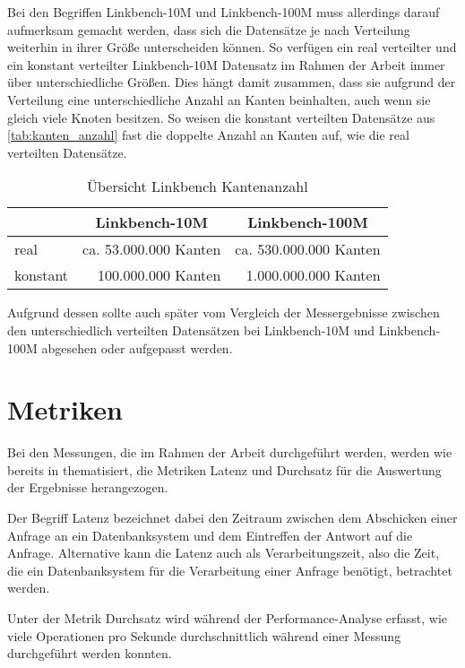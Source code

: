 Bei den Begriffen Linkbench-10M und Linkbench-100M muss allerdings darauf aufmerksam gemacht werden, dass sich die Datensätze je nach Verteilung weiterhin in ihrer Größe unterscheiden können. So verfügen ein real verteilter und ein konstant verteilter Linkbench-10M Datensatz im Rahmen der Arbeit immer über unterschiedliche Größen. Dies hängt damit zusammen, dass sie aufgrund der Verteilung eine unterschiedliche Anzahl an Kanten beinhalten, auch wenn sie gleich viele Knoten besitzen. So weisen die konstant verteilten Datensätze aus \autoref{tab:kanten_anzahl} fast die doppelte Anzahl an Kanten auf, wie die real verteilten Datensätze. 

\begin{table}[ht]
    \centering
    \begin{tabular}{l|r|r}
    \hline
    \rowcolor[HTML]{EFEFEF} 
    \multicolumn{1}{c|}{\cellcolor[HTML]{EFEFEF}\textbf{Verteilung}} & \multicolumn{1}{c|}{\cellcolor[HTML]{EFEFEF}\textbf{Linkbench-10M}} & \multicolumn{1}{c}{\cellcolor[HTML]{EFEFEF}\textbf{Linkbench-100M}} \\ \hline
    real & ca. 53.000.000 Kanten & ca. 530.000.000 Kanten \\
    konstant & 100.000.000 Kanten & 1.000.000.000 Kanten \\ \hline
    \end{tabular}
    \caption{Übersicht Linkbench Kantenanzahl}
    \label{tab:kanten_anzahl}
\end{table}

Aufgrund dessen sollte auch später vom Vergleich der Messergebnisse zwischen den unterschiedlich verteilten Datensätzen bei Linkbench-10M und Linkbench-100M abgesehen oder aufgepasst werden.

\section{Metriken}
\label{analyse:metriken}
Bei den Messungen, die im Rahmen der Arbeit durchgeführt werden, werden wie bereits in \cite{sigmod_tian} thematisiert, die Metriken Latenz und Durchsatz für die Auswertung der Ergebnisse herangezogen. 

Der Begriff Latenz bezeichnet dabei den Zeitraum zwischen dem Abschicken einer Anfrage an ein Datenbanksystem und dem Eintreffen der Antwort auf die Anfrage. Alternative kann die Latenz auch als Verarbeitungszeit, also die Zeit, die ein Datenbanksystem für die Verarbeitung einer Anfrage benötigt, betrachtet werden. 

Unter der Metrik Durchsatz wird während der Performance-Analyse erfasst, wie viele Operationen pro Sekunde durchschnittlich während einer Messung durchgeführt werden konnten. 

